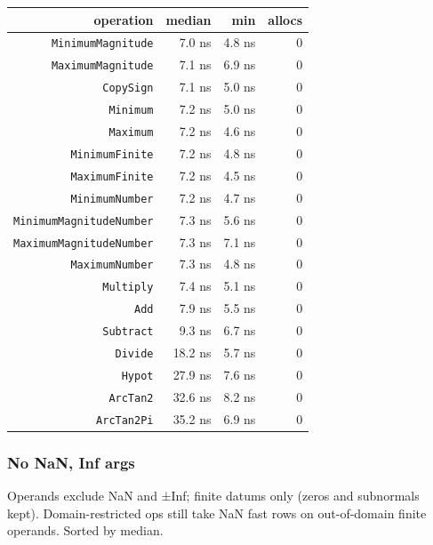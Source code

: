 \begin{table}[h]
\centering
\begin{tabulary}{\linewidth}{R R R R}
\toprule
operation & median & min & allocs \\
\toprule
\texttt{MinimumMagnitude} & 7.0 ns & 4.8 ns & 0 \\
\texttt{MaximumMagnitude} & 7.1 ns & 6.9 ns & 0 \\
\texttt{CopySign} & 7.1 ns & 5.0 ns & 0 \\
\texttt{Minimum} & 7.2 ns & 5.0 ns & 0 \\
\texttt{Maximum} & 7.2 ns & 4.6 ns & 0 \\
\texttt{MinimumFinite} & 7.2 ns & 4.8 ns & 0 \\
\texttt{MaximumFinite} & 7.2 ns & 4.5 ns & 0 \\
\texttt{MinimumNumber} & 7.2 ns & 4.7 ns & 0 \\
\texttt{MinimumMagnitudeNumber} & 7.3 ns & 5.6 ns & 0 \\
\texttt{MaximumMagnitudeNumber} & 7.3 ns & 7.1 ns & 0 \\
\texttt{MaximumNumber} & 7.3 ns & 4.8 ns & 0 \\
\texttt{Multiply} & 7.4 ns & 5.1 ns & 0 \\
\texttt{Add} & 7.9 ns & 5.5 ns & 0 \\
\texttt{Subtract} & 9.3 ns & 6.7 ns & 0 \\
\texttt{Divide} & 18.2 ns & 5.7 ns & 0 \\
\texttt{Hypot} & 27.9 ns & 7.6 ns & 0 \\
\texttt{ArcTan2} & 32.6 ns & 8.2 ns & 0 \\
\texttt{ArcTan2Pi} & 35.2 ns & 6.9 ns & 0 \\
\bottomrule
\end{tabulary}

\end{table}



\subsubsection{No NaN, Inf args}



\label{9842352165407780921}{}


Operands exclude NaN and ±Inf; finite datums only (zeros and subnormals kept). Domain-restricted ops still take NaN fast rows on out-of-domain finite operands. Sorted by median.




